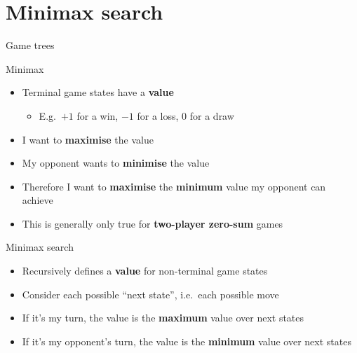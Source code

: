 \part{Minimax search}
\frame{\partpage}

\begin{frame}{Game trees}
	\centering
\end{frame}

\begin{frame}{Minimax}
	\begin{itemize}
		\pause\item Terminal game states have a \textbf{value}
			\begin{itemize}
				\pause\item E.g.\ $+1$ for a win, $-1$ for a loss, $0$ for a draw
			\end{itemize}
		\pause\item I want to \textbf{maximise} the value
		\pause\item My opponent wants to \textbf{minimise} the value
		\pause\item Therefore I want to \textbf{maximise} the \textbf{minimum} value my opponent can achieve
		\pause\item This is generally only true for \textbf{two-player zero-sum} games
	\end{itemize}
\end{frame}

\begin{frame}{Minimax search}
	\begin{itemize}
		\pause\item Recursively defines a \textbf{value} for non-terminal game states
		\pause\item Consider each possible ``next state'', i.e.\ each possible move
		\pause\item If it's my turn, the value is the \textbf{maximum} value over next states
		\pause\item If it's my opponent's turn, the value is the \textbf{minimum} value over next states
	\end{itemize}
\end{frame}

